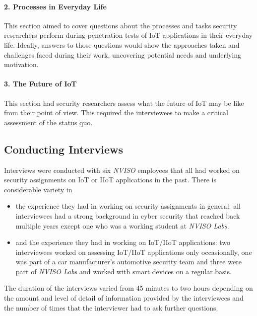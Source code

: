 \paragraph{2. Processes in Everyday Life} This section aimed to cover questions about the processes and tasks security researchers perform during penetration tests of IoT applications in their everyday life. Ideally, answers to those questions would show the approaches taken and challenges faced during their work, uncovering potential needs and underlying motivation.
\paragraph{3. The Future of IoT} This section had security researchers assess what the future of IoT may be like from their point of view. This required the interviewees to make a critical assessment of the status quo.



\subsection{Conducting Interviews}
Interviews were conducted with six %
\emph{NVISO} employees that all had worked on security assignments on \ac{IoT} or \ac{IIoT} applications in the past. There is considerable variety in
\begin{itemize}
    \item the experience they had in working on security assignments in general: all interviewees had a strong background in cyber security that reached back multiple years except one who was a working student at \emph{NVISO Labs}.
    \item and the experience they had in working on \ac{IoT}/\ac{IIoT} applications: two interviewees worked on assessing \ac{IoT}/\ac{IIoT} applications only occasionally, one was part of a car manufacturer's automotive security team and three were part of \emph{NVISO Labs} and worked with smart devices on a regular basis.
\end{itemize}
The duration of the interviews varied from 45 minutes to two hours depending on the amount and level of detail of information provided by the interviewees and the number of times that the interviewer had to ask further questions.

